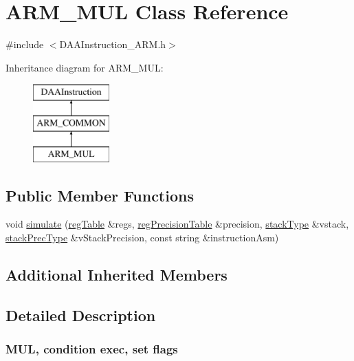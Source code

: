 \hypertarget{classARM__MUL}{}\section{A\+R\+M\+\_\+\+M\+UL Class Reference}
\label{classARM__MUL}


{\ttfamily \#include $<$D\+A\+A\+Instruction\+\_\+\+A\+R\+M.\+h$>$}

Inheritance diagram for A\+R\+M\+\_\+\+M\+UL\+:\begin{figure}[H]
\begin{center}
\leavevmode
\includegraphics[height=3.000000cm]{classARM__MUL}
\end{center}
\end{figure}
\subsection*{Public Member Functions}
\begin{DoxyCompactItemize}
\item 
void \hyperlink{classARM__MUL_a57f827247b5ee156334e9963b3c6bfd4}{simulate} (\hyperlink{DAAInstruction_8h_af0fae93a861de9cf37988d5673cac523}{reg\+Table} \&regs, \hyperlink{DAAInstruction_8h_a0e8cae02815a5f8adc750122d790b455}{reg\+Precision\+Table} \&precision, \hyperlink{DAAInstruction_8h_a1b0e70ac1a04f06c8132055ed01f589f}{stack\+Type} \&vstack, \hyperlink{DAAInstruction_8h_ac5cb793e9dac3fa9693da78b7e29ab30}{stack\+Prec\+Type} \&v\+Stack\+Precision, const string \&instruction\+Asm)
\end{DoxyCompactItemize}
\subsection*{Additional Inherited Members}


\subsection{Detailed Description}


 \subsubsection*{M\+UL, condition exec, set flags }

